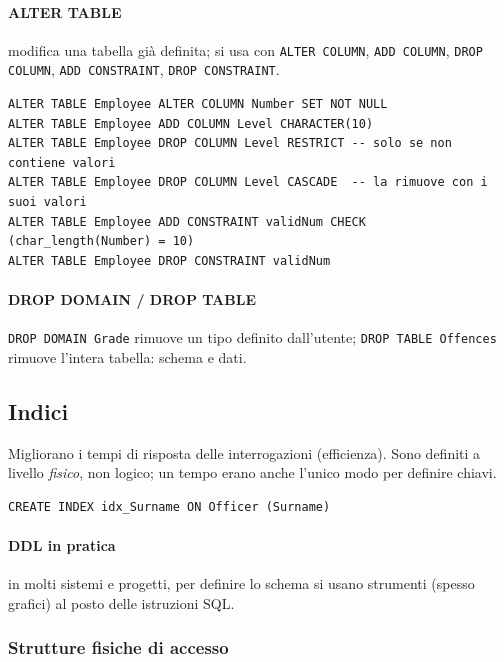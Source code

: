 \documentclass[a4paper,12pt]{article}
\begin{document}
\paragraph{ALTER TABLE} modifica una tabella già definita; si usa con
\texttt{ALTER COLUMN}, \texttt{ADD COLUMN}, \texttt{DROP COLUMN},
\texttt{ADD CONSTRAINT}, \texttt{DROP CONSTRAINT}.
\begin{verbatim}
ALTER TABLE Employee ALTER COLUMN Number SET NOT NULL
ALTER TABLE Employee ADD COLUMN Level CHARACTER(10)
ALTER TABLE Employee DROP COLUMN Level RESTRICT -- solo se non contiene valori
ALTER TABLE Employee DROP COLUMN Level CASCADE  -- la rimuove con i suoi valori
ALTER TABLE Employee ADD CONSTRAINT validNum CHECK (char_length(Number) = 10)
ALTER TABLE Employee DROP CONSTRAINT validNum
\end{verbatim}

\paragraph{DROP DOMAIN / DROP TABLE} \texttt{DROP DOMAIN Grade} rimuove un tipo
definito dall'utente; \texttt{DROP TABLE Offences} rimuove l'intera tabella:
schema e dati.

\subsection{Indici}

Migliorano i tempi di risposta delle interrogazioni (efficienza). Sono definiti
a livello \emph{fisico}, non logico; un tempo erano anche l'unico modo per
definire chiavi.
\begin{verbatim}
CREATE INDEX idx_Surname ON Officer (Surname)
\end{verbatim}

\paragraph{DDL in pratica} in molti sistemi e progetti, per definire lo schema
si usano strumenti (spesso grafici) al posto delle istruzioni SQL.

\subsubsection{Strutture fisiche di accesso}
\end{document}
